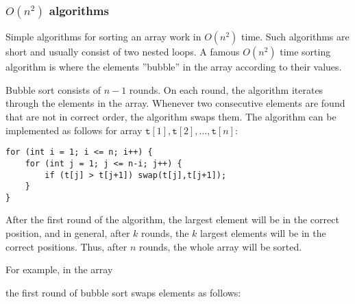\subsubsection{$O(n^2)$ algorithms}


Simple algorithms for sorting an array
work in $O(n^2)$ time.
Such algorithms are short and usually
consist of two nested loops.
A famous $O(n^2)$ time sorting algorithm
is  where the elements
''bubble'' in the array according to their values.

Bubble sort consists of $n-1$ rounds.
On each round, the algorithm iterates through
the elements in the array.
Whenever two consecutive elements are found
that are not in correct order,
the algorithm swaps them.
The algorithm can be implemented as follows
for array
$\texttt{t}[1],\texttt{t}[2],\ldots,\texttt{t}[n]$:
\begin{lstlisting}
for (int i = 1; i <= n; i++) {
    for (int j = 1; j <= n-i; j++) {
        if (t[j] > t[j+1]) swap(t[j],t[j+1]);
    }
}
\end{lstlisting}

After the first round of the algorithm,
the largest element will be in the correct position,
and in general, after $k$ rounds, the $k$ largest
elements will be in the correct positions.
Thus, after $n$ rounds, the whole array
will be sorted.

For example, in the array

\begin{center}
\end{center}

\noindent
the first round of bubble sort swaps elements
as follows:

\begin{center}
\end{center}

